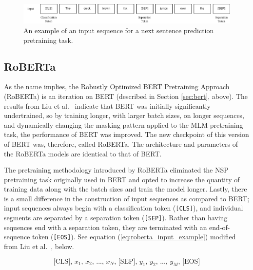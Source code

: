 \documentclass[12pt]{article}
\begin{document}
\begin{figure}
    \includegraphics[width=\linewidth]{figures/BERT_NSP_input.png}
    \caption{An example of an input sequence for a next sentence prediction pretraining task.}
    \label{fig:bert_nsp_input_example}
\end{figure}

\subsection{RoBERTa}\label{sec:roberta}
As the name implies, the Robustly Optimized BERT Pretraining Approach (RoBERTa) is an iteration on BERT (described in Section \ref{sec:bert}, above).
The results from Liu et al.~\cite{liu_roberta_2019} indicate that BERT was initially significantly undertrained, so by training longer, with larger
batch sizes, on longer sequences, and dynamically changing the masking pattern applied to the MLM pretraining task, the performance of BERT was
improved. The new checkpoint of this version of BERT was, therefore, called RoBERTa. The architecture and parameters of the RoBERTa models are
identical to that of BERT.

The pretraining methodology introduced by RoBERTa eliminated the NSP pretraining task originally used in BERT and opted to increase the quantity of
training data along with the batch sizes and train the model longer. Lastly, there is a small difference in the construction of input sequences as
compared to BERT; input sequences always begin with a classification token (\lstinline|[CLS]|), and individual segments are separated by a separation
token (\lstinline|[SEP]|). Rather than having sequences end with a separation token, they are terminated with an end-of-sequence token
(\lstinline|[EOS]|). See equation (\ref{eq:roberta_input_example}) modified from Liu et al.~\cite{liu_roberta_2019}, below.

\begin{equation}\label{eq:roberta_input_example}
    \mbox{[CLS], $x_1$, $x_2$, ..., $x_N$, [SEP], $y_1$, $y_2$, ..., $y_M$, [EOS]}
\end{equation}
\end{document}
